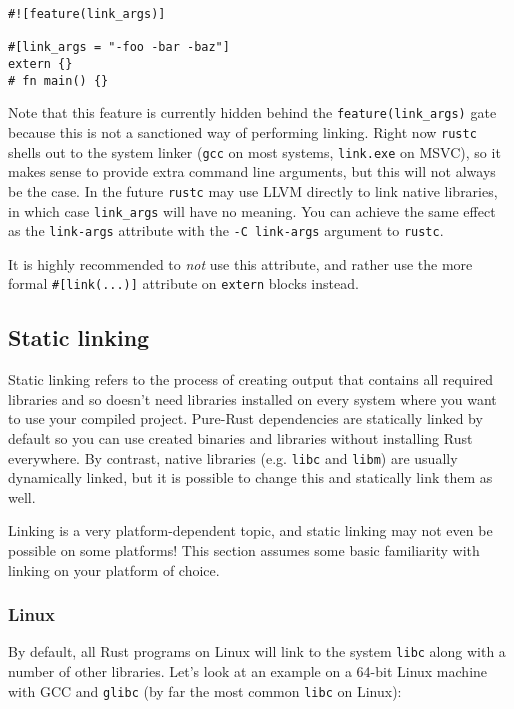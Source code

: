 \documentclass[a4paper,]{book}
\begin{document}
\begin{verbatim}
#![feature(link_args)]

#[link_args = "-foo -bar -baz"]
extern {}
# fn main() {}
\end{verbatim}

Note that this feature is currently hidden behind the
\texttt{feature(link\_args)} gate because this is not a sanctioned way
of performing linking. Right now \texttt{rustc} shells out to the system
linker (\texttt{gcc} on most systems, \texttt{link.exe} on MSVC), so it
makes sense to provide extra command line arguments, but this will not
always be the case. In the future \texttt{rustc} may use LLVM directly
to link native libraries, in which case \texttt{link\_args} will have no
meaning. You can achieve the same effect as the \texttt{link-args}
attribute with the \texttt{-C\ link-args} argument to \texttt{rustc}.

It is highly recommended to \emph{not} use this attribute, and rather
use the more formal \texttt{\#{[}link(...){]}} attribute on
\texttt{extern} blocks instead.

\subsection{Static linking}\label{static-linking}

Static linking refers to the process of creating output that contains
all required libraries and so doesn't need libraries installed on every
system where you want to use your compiled project. Pure-Rust
dependencies are statically linked by default so you can use created
binaries and libraries without installing Rust everywhere. By contrast,
native libraries (e.g. \texttt{libc} and \texttt{libm}) are usually
dynamically linked, but it is possible to change this and statically
link them as well.

Linking is a very platform-dependent topic, and static linking may not
even be possible on some platforms! This section assumes some basic
familiarity with linking on your platform of choice.

\subsubsection{Linux}\label{linux}

By default, all Rust programs on Linux will link to the system
\texttt{libc} along with a number of other libraries. Let's look at an
example on a 64-bit Linux machine with GCC and \texttt{glibc} (by far
the most common \texttt{libc} on Linux):
\end{document}
